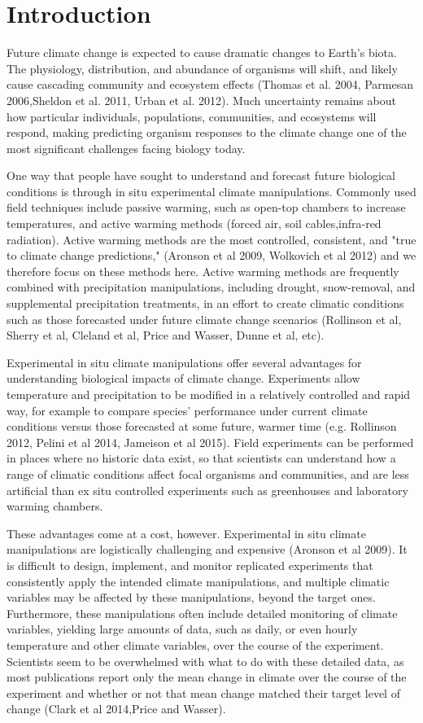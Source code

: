 \documentclass{article}
\begin{document}
\section {Introduction}
\par Future climate change is expected to cause dramatic changes to Earth's biota. The physiology, distribution, and abundance of organisms will shift, and likely cause cascading community and ecosystem effects (Thomas et al. 2004, Parmesan 2006,Sheldon et al. 2011, Urban et al. 2012). Much uncertainty remains about how particular individuals, populations, communities, and ecosystems will respond, making predicting organism responses to the climate change one of the most significant challenges facing biology today.
\par One way that people have sought to understand and forecast future biological conditions is through in situ experimental climate manipulations. Commonly used field techniques include passive warming, such as open-top chambers to increase temperatures, and active warming methods (forced air, soil cables,infra-red radiation). Active warming methods are the most controlled, consistent, and "true to climate change predictions," (Aronson et al 2009, Wolkovich et al 2012) and we therefore focus on these methods here. Active warming methods are frequently combined with precipitation manipulations, including drought, snow-removal, and supplemental precipitation treatments, in an effort to create climatic conditions such as those forecasted under future climate change scenarios (Rollinson et al, Sherry et al, Cleland et al, Price and Wasser, Dunne et al, etc).
\par Experimental in situ climate manipulations offer several advantages for understanding biological impacts of climate change. Experiments allow temperature and precipitation to be modified in a relatively controlled and rapid way, for example to compare species' performance under current climate conditions versus those forecasted at some future, warmer time (e.g. Rollinson 2012, Pelini et al 2014, Jameison et al 2015). Field experiments can be performed in places where no historic data exist, so that scientists can understand how a range of climatic conditions affect focal organisms and communities, and are less artificial than ex situ controlled experiments such as greenhouses and laboratory warming chambers.
\par These advantages come at a cost, however. Experimental in situ climate manipulations are logistically challenging and expensive (Aronson et al 2009). It is difficult to design, implement, and monitor replicated experiments that consistently apply the intended climate manipulations, and multiple climatic variables may be affected by these manipulations, beyond the target ones. Furthermore, these manipulations often include detailed monitoring of climate variables, yielding large amounts of data, such as daily, or even hourly temperature and other climate variables, over the course of the experiment. Scientists seem to be overwhelmed with what to do with these detailed data, as most publications report only the mean change in climate over the course of the experiment and whether or not that mean change matched their target level of change (Clark et al 2014,Price and Wasser). 
\end{document}
